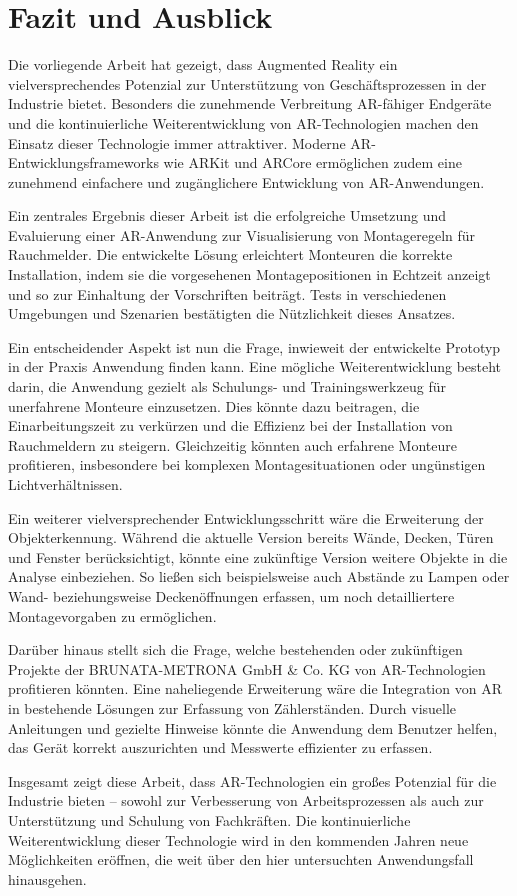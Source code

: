 \chapter{Fazit und Ausblick}

Die vorliegende Arbeit hat gezeigt, dass Augmented Reality ein vielversprechendes Potenzial zur Unterstützung von Geschäftsprozessen in der Industrie bietet. Besonders die zunehmende Verbreitung AR-fähiger Endgeräte und die kontinuierliche Weiterentwicklung von AR-Technologien machen den Einsatz dieser Technologie immer attraktiver. Moderne AR-Entwicklungsframeworks wie ARKit und ARCore ermöglichen zudem eine zunehmend einfachere und zugänglichere Entwicklung von AR-Anwendungen.

Ein zentrales Ergebnis dieser Arbeit ist die erfolgreiche Umsetzung und Evaluierung einer AR-Anwendung zur Visualisierung von Montageregeln für Rauchmelder. Die entwickelte Lösung erleichtert Monteuren die korrekte Installation, indem sie die vorgesehenen Montagepositionen in Echtzeit anzeigt und so zur Einhaltung der Vorschriften beiträgt. Tests in verschiedenen Umgebungen und Szenarien bestätigten die Nützlichkeit dieses Ansatzes.

Ein entscheidender Aspekt ist nun die Frage, inwieweit der entwickelte Prototyp in der Praxis Anwendung finden kann. Eine mögliche Weiterentwicklung besteht darin, die Anwendung gezielt als Schulungs- und Trainingswerkzeug für unerfahrene Monteure einzusetzen. Dies könnte dazu beitragen, die Einarbeitungszeit zu verkürzen und die Effizienz bei der Installation von Rauchmeldern zu steigern. Gleichzeitig könnten auch erfahrene Monteure profitieren, insbesondere bei komplexen Montagesituationen oder ungünstigen Lichtverhältnissen.

Ein weiterer vielversprechender Entwicklungsschritt wäre die Erweiterung der Objekterkennung. Während die aktuelle Version bereits Wände, Decken, Türen und Fenster berücksichtigt, könnte eine zukünftige Version weitere Objekte in die Analyse einbeziehen. So ließen sich beispielsweise auch Abstände zu Lampen oder Wand- beziehungsweise Deckenöffnungen erfassen, um noch detailliertere Montagevorgaben zu ermöglichen.

Darüber hinaus stellt sich die Frage, welche bestehenden oder zukünftigen Projekte der BRUNATA-METRONA GmbH \& Co. KG von AR-Technologien profitieren könnten. Eine naheliegende Erweiterung wäre die Integration von AR in bestehende Lösungen zur Erfassung von Zählerständen. Durch visuelle Anleitungen und gezielte Hinweise könnte die Anwendung dem Benutzer helfen, das Gerät korrekt auszurichten und Messwerte effizienter zu erfassen.

Insgesamt zeigt diese Arbeit, dass AR-Technologien ein großes Potenzial für die Industrie bieten – sowohl zur Verbesserung von Arbeitsprozessen als auch zur Unterstützung und Schulung von Fachkräften. Die kontinuierliche Weiterentwicklung dieser Technologie wird in den kommenden Jahren neue Möglichkeiten eröffnen, die weit über den hier untersuchten Anwendungsfall hinausgehen.